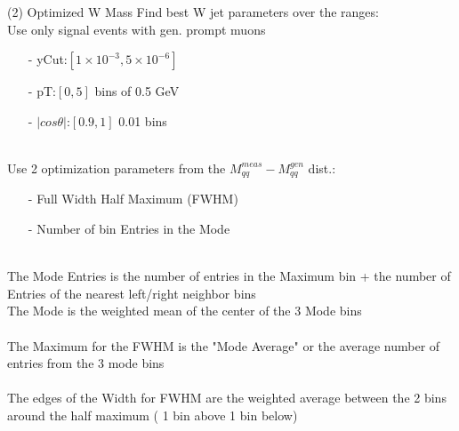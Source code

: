 \documentclass[10pt]{beamer}
\begin{document}
\begin{frame}{(2) Optimized W Mass}
Find best W jet parameters over the ranges:\\
Use only signal events with gen. prompt muons\\
\begin{itemize}
\item[-]yCut:$[1\times10^{-3}, 5\times10^{-6}]$ \\
\item[-]pT:$[0,5]$ bins of 0.5 GeV\\
\item[-]$|cos\theta|$:$[0.9,1]$ 0.01 bins\\
\end{itemize}
\quad \quad \\
Use 2 optimization parameters from the $M_{qq}^{meas} - M_{qq}^{gen}$ dist.:\\
\begin{itemize}
\item[-] Full Width Half Maximum (FWHM) \\
\item[-]Number of bin Entries in the Mode\\
\end{itemize}
\quad \quad \\ 
\scriptsize
The Mode Entries is the number of entries in the Maximum bin + the number of Entries of the nearest left/right neighbor bins\\
The Mode is the weighted mean of the center of the 3 Mode bins\\
\quad \quad \\ 
The Maximum for the FWHM is the "Mode Average" or the average number of entries from the 3 mode bins\\
\quad \quad \\ 
The edges of the Width for FWHM are the weighted average between the 2 bins around the half maximum ( 1 bin above 1 bin below) 
\end{frame}
\end{document}
